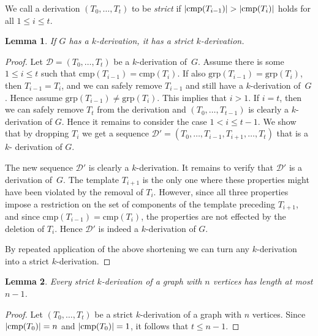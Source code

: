 \documentclass[10pt,usletter]{article}
\newtheorem{lemma}{Lemma}
\theoremstyle{remark}
\newcommand{\DDD}{\mathcal{D}}
\newcommand{\hy}{\hbox{-}\nobreak\hskip0pt}
\newcommand{\comps}{\text{cmp}}
\newcommand{\groups}{\text{grp}}
\begin{document}
 


\sloppypar We call a derivation $(T_0,\dots,T_t)$ to be \emph{strict}
if $\Card{\comps(T_{i-1})} > \Card{\comps(T_{i})}$ holds for all
$1\leq i \leq t$. 
\begin{lemma}\label{lem:make-strict}
  If $G$ has a $k$\hy derivation, it has a strict $k$\hy derivation.
\end{lemma}
\begin{proof}
  Let $\DDD=(T_0,\dots,T_t)$ be a $k$\hy derivation of~$G$.  Assume
  there is some $1 \leq i\leq t$ such that
  $\comps(T_{i-1})=\comps(T_{i})$.  If also
  $\groups(T_{i-1})=\groups(T_{i})$, then $T_{i-1}=T_i$, and we can
  safely remove $T_{i-1}$ and still have a $k$\hy derivation
  of~$G$. Hence assume $\groups(T_{i-1})\neq \groups(T_{i})$.  This
  implies that $i>1$.  If $i=t$, then we can safely remove $T_t$ from
  the derivation and $(T_0,\dots,T_{t-1})$ is clearly a $k$\hy
  derivation of $G$. Hence it remains to consider the case $1 < i
  \leq t-1$.  We show that by dropping $T_i$ we get a sequence
  $\DDD'=(T_0,\dots,T_{i-1},T_{i+1},\dots,T_t)$ that is a $k$\hy
  derivation of $G$. 

  The new sequence $\DDD'$ is clearly a $k$\hy derivation.  It remains
  to verify that $\DDD'$ is a derivation of~$G$. The template
  $T_{i+1}$ is the only one where these properties might have been
  violated by the removal of $T_i$. However, since all three
  properties impose a restriction on the set of components of the
  template preceding $T_{i+1}$, and since
  $\comps(T_{i-1})=\comps(T_{i})$, the properties are not effected by
  the deletion of $T_i$. Hence $\DDD'$ is indeed a $k$\hy derivation
  of $G$.

  By repeated application of the above shortening we can turn any
  $k$\hy derivation into a strict $k$\hy derivation.
\end{proof}


\begin{lemma}\label{lem:strict-short}
  Every strict $k$\hy derivation of a graph with $n$ vertices has
  length at most $n-1$.
\end{lemma}
\begin{proof}
  Let $(T_0,\dots,T_t)$ be a strict $k$\hy derivation of a graph with
  $n$ vertices.  Since $\Card{\comps(T_{0})}=n$ and
  $\Card{\comps(T_{0})}=1$, it follows that $t\leq n-1$.
\end{proof}

\medskip
\end{document}
